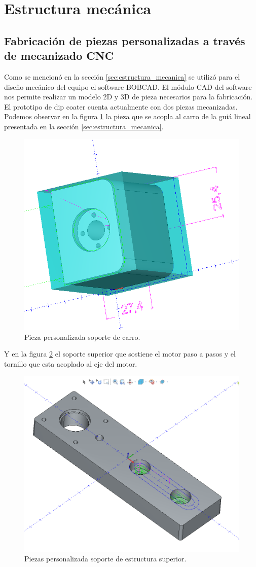 
\section{Estructura mecánica}
\subsection{Fabricación de piezas personalizadas a través de mecanizado CNC}

Como se mencionó en la sección \ref{sec:estructura_mecanica} se utilizó para el diseño mecánico del equipo el software BOBCAD. El módulo CAD del software nos permite realizar un modelo 2D y 3D de pieza necesarios para la fabricación. El prototipo de dip coater cuenta actualmente con dos piezas mecanizadas. Podemos observar en la figura \ref{fig:carro} la pieza que se acopla al carro de la guiá lineal presentada en la sección \ref{sec:estructura_mecanica}.

\begin{figure}[ht]
	\centering
	\includegraphics[width=.5\textwidth]{./Figures/3d_carro.png}
	\caption{Pieza personalizada soporte de carro.}
	\label{fig:carro}
\end{figure}

Y en la figura \ref{fig:estructura_superior} el soporte superior que sostiene el motor paso a pasos y el  tornillo que esta acoplado al eje del motor.

\begin{figure}[ht]
	\centering
	\includegraphics[width=.5\textwidth]{./Figures/3d_top.png}
	\caption{Piezas personalizada soporte de estructura superior.}
	\label{fig:estructura_superior}
\end{figure}

